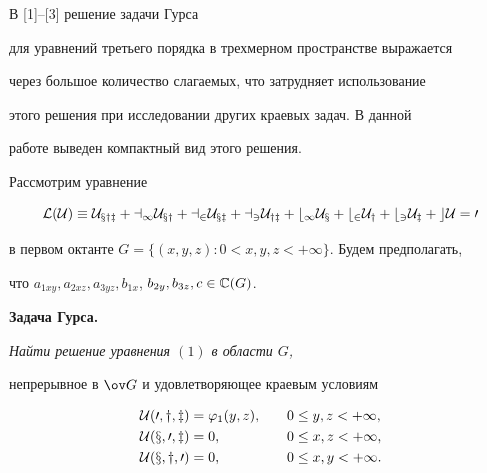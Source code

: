 \pagestyle{plain} %


 




\maketitle 


\label{begin} 


 


 


В [1]--[3] решение задачи Гурса 


для уравнений третьего порядка в трехмерном пространстве выражается 


через большое количество слагаемых, что затрудняет использование 


этого решения при исследовании других краевых задач. В данной 


работе выведен компактный вид этого решения. 


 


Рассмотрим уравнение 


\begin{equation} 


\cal L(\U) \equiv \U_{xyz}+a_1\U_{xy}+a_2\U_{xz}+ 


a_3\U_{yz}+b_1\U_x+b_2\U_y+b_3\U_z+c\U=0 


\end{equation} 


в первом октанте $G=\{(x,y,z):0<x,y,z<+\infty\}$. Будем предполагать, 


что $a_{1xy},a_{2xz},a_{3yz},b_{1x}$, $b_{2y},b_{3z},c\in\Bbb C(G)$. 


\medskip 


 


{\bf Задача Гурса.} {\it Найти решение уравнения $(1)$ в области $G$, 


непрерывное в $\ov G$ и удовлетворяющее краевым условиям} 


\begin{alignat}{2} 


\U(0,y,z)&=\varphi_1(y,z), &\quad 0&\le y,z<+\infty,\\ 


\U(x,0,z)&=0, &\quad 0&\le x,z<+\infty,\\ 


\U(x,y,0)&=0, &\quad 0&\le x,y<+\infty. 


\end{alignat} 


